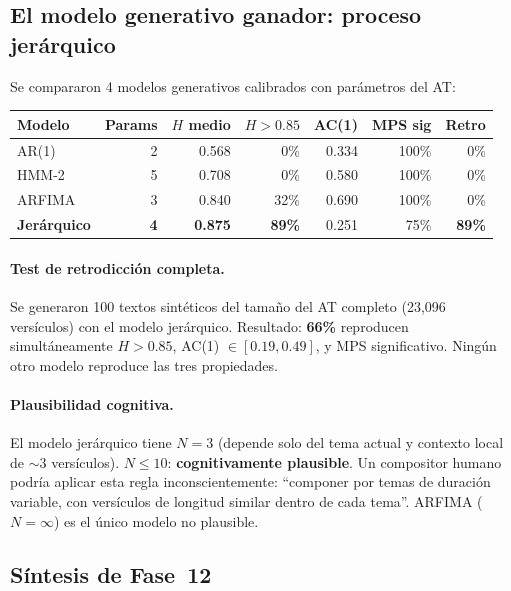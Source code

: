 \documentclass[12pt,a4paper]{article}
\newcommand{\val}[1]{\textcolor{hlcolor}{\textbf{#1}}}
\begin{document}
\subsection{El modelo generativo ganador: proceso jer\'arquico}

Se compararon 4 modelos generativos calibrados con par\'ametros del AT:

\begin{center}\small
\begin{tabular}{lrrrrrr}
\toprule
Modelo & Params & $H$ medio & $H > 0.85$ & AC(1) & MPS sig & Retro \\
\midrule
AR(1)        & 2 & 0.568 &   0\% & 0.334 & 100\% &  0\% \\
HMM-2        & 5 & 0.708 &   0\% & 0.580 & 100\% &  0\% \\
ARFIMA       & 3 & 0.840 &  32\% & 0.690 & 100\% &  0\% \\
\textbf{Jer\'arquico} & \textbf{4} & \val{0.875} & \val{89\%} & 0.251 & 75\% & \val{89\%} \\
\bottomrule
\end{tabular}
\end{center}

\paragraph{Test de retrodicci\'on completa.}
Se generaron 100 textos sint\'eticos del tama\~no del AT completo (23,096 vers\'iculos)
con el modelo jer\'arquico. Resultado: \textbf{66\%} reproducen simult\'aneamente
$H > 0.85$, AC(1) $\in [0.19, 0.49]$, y MPS significativo.
Ning\'un otro modelo reproduce las tres propiedades.

\paragraph{Plausibilidad cognitiva.}
El modelo jer\'arquico tiene $N = 3$ (depende solo del tema actual y contexto
local de $\sim$3 vers\'iculos). $N \leq 10$: \textbf{cognitivamente plausible}.
Un compositor humano podr\'ia aplicar esta regla inconscientemente:
``componer por temas de duraci\'on variable, con versículos de longitud
similar dentro de cada tema''. ARFIMA ($N = \infty$) es el \'unico modelo
no plausible.

\subsection{S\'intesis de Fase~12}
\end{document}
